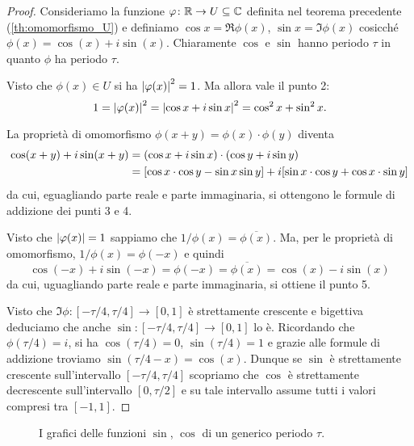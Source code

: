 \begin{proof}
Consideriamo la funzione $\varphi\colon {\mathbb R} \to U\subseteq {\mathbb C}$ 
definita nel teorema precedente (\ref{th:omomorfismo_U}) 
e definiamo $\cos x = \Re \phi(x)$, $\sin x = \Im \phi(x)$
cosicché $\phi(x) = \cos(x) + i \sin (x)$.
Chiaramente $\cos$ e $\sin$ hanno periodo $\tau$ in quanto 
$\phi$ ha periodo $\tau$.

Visto che $\phi(x)\in U$ si ha ${\left|\varphi(x)\right|}^2=1$.
Ma allora vale il punto 2:
\[
 1 = {\left|\varphi(x)\right|}^2 
 = {\left|\cos x + i\sin x\right|}^2 
 = \cos^2 x + \sin^2 x.
\]

La proprietà di omomorfismo 
$\phi(x+y)=\phi(x)\cdot \phi(y)$ diventa 
\begin{align*}
  \cos(x+y) + i \sin(x+y)
  &=(\cos x + i \sin x)\cdot(\cos y + i \sin y) \\
  &= 
  {\left[ \cos x\cdot \cos y - \sin x \sin y \right]}
  + i{\left[ \sin x\cdot \cos y + \cos x\cdot \sin y \right]}
\end{align*}
da cui, eguagliando parte reale e parte immaginaria, 
si ottengono le formule di addizione dei punti 3 e 4.

Visto che ${\left|\varphi(x)\right|}=1$ sappiamo che 
$1/\phi(x) = \overline{\phi(x)}$. 
Ma, per le proprietà di omomorfismo, $1/\phi(x)=\phi(-x)$ e quindi 
\[
\cos (-x) + i \sin(-x) 
= \phi(-x) 
= \overline{\phi(x)}
= \cos(x) - i \sin(x)
\]
da cui, uguagliando parte reale e parte immaginaria, 
si ottiene il punto 5.

Visto che $\Im \phi\colon[-\tau/4,\tau/4]\to[0,1]$ è strettamente crescente e bigettiva
deduciamo che anche $\sin\colon[-\tau/4,\tau/4]\to [0,1]$ lo è.
Ricordando che $\phi(\tau/4)=i$, 
si ha $\cos(\tau/4)=0$, $\sin(\tau/4)=1$ e grazie alle formule 
di addizione troviamo $\sin(\tau/4-x)=\cos(x)$.
Dunque se $\sin$ è strettamente crescente sull'intervallo 
$[-\tau/4,\tau/4]$ scopriamo che $\cos$ è strettamente 
decrescente sull'intervallo $[0,\tau/2]$
e su tale intervallo assume 
tutti i valori compresi tra $[-1,1]$.
\end{proof}

\begin{figure}
  \centering%
  \caption{%
  I grafici delle funzioni $\sin$, $\cos$ di 
  un generico periodo $\tau$.}
\end{figure}

